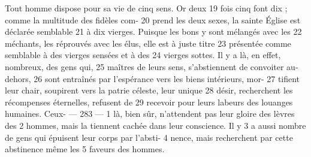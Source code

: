 	Tout homme dispose pour sa vie de cinq sens. Or deux	 
19	 	fois cinq font dix ; comme la multitude des fidèles com-	 
20	 	prend les deux sexes, la sainte Église est déclarée semblable	 
21	 	à dix vierges. Puisque les bons y sont mélangés avec les	 
22	 	méchants, les réprouvés avec les élus, elle est à juste titre	 
23	 	présentée comme semblable à des vierges sensées et à des	 
24	 	vierges sottes. Il y a là, en effet, nombreux, des gens qui,	 
25	 	maîtres de leurs sens, s'abstiennent de convoiter au-dehors,	 
26	 	sont entraînés par l'espérance vers les biens intérieurs, mor-	 
27	 	tifient leur chair, soupirent vers la patrie céleste, leur unique	 
28	 	désir, recherchent les récompenses éternelles, refusent de	 
29	 	recevoir pour leurs labeurs des louanges humaines. Ceux-	 
 	--- 283 ---	 
1	 	là, bien sûr, n'attendent pas leur gloire des lèvres des	 
2	 	hommes, mais la tiennent cachée dans leur conscience. Il y	 
3	 	a aussi nombre de gens qui épuisent leur corps par l'absti-	 
4	 	nence, mais recherchent par cette abstinence même les	 
5	 	faveurs des hommes.